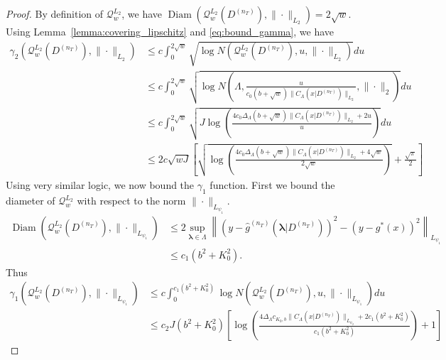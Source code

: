 \documentclass[10pt]{book}
\theoremstyle{definition}
\DeclareMathOperator{\Diam}{Diam}
\begin{document}
\begin{proof}
	By definition of $\mathcal{Q}_{w}^{L_{2}}$, we have $\Diam\left(\mathcal{Q}_{w}^{L_{2}}(D^{(n_{T})}),\|\cdot\|_{L_{2}}\right)	=	2\sqrt{w}.$
	Using Lemma~\ref{lemma:covering_lipschitz} and \eqref{eq:bound_gamma}, we have
	\begin{align}
	\gamma_{2}\left(\mathcal{Q}_{w}^{L_{2}}(D^{(n_{T})}),\|\cdot\|_{L_{2}}\right)
	& \le	c\int_{0}^{2\sqrt{w}}\sqrt{\log N\left(\mathcal{Q}_{w}^{L_{2}}(D^{(n_{T})}),u,\|\cdot\|_{L_{2}}\right)}du \\
	& \le	c\int_{0}^{2\sqrt{w}}\sqrt{\log N\left(\Lambda,\frac{u}{c_0 \left(b +\sqrt{w}\right)\|C_\Lambda(x|D^{(n_T)})\|_{L_{2}}},\|\cdot\|_{2}\right)}du \\
	& \le	c\int_{0}^{2\sqrt{w}}\sqrt{J\log\left(\frac{4 c_0 \Delta_{\Lambda}\left(b +\sqrt{w}\right)\|C_\Lambda(x|D^{(n_T)})\|_{L_{2}}+2u}{u}\right)}du\\
	& \le	2c\sqrt{w J}\left[\sqrt{\log\left(\frac{4 c_0  \Delta_{\Lambda}\left(b +\sqrt{w}\right)\|C_\Lambda(x|D^{(n_T)})\|_{L_{2}}+4\sqrt{w}}{2\sqrt{w}}\right)}+\frac{\sqrt{\pi}}{2}\right]
	\end{align}
	Using very similar logic, we now bound the $\gamma_1$ function.
	First we bound the diameter of $\mathcal{Q}_w^{L_2}$ with respect to the norm $\|\cdot \|_{L_{\psi_1}}$.
	\begin{align}
	\Diam(\mathcal{Q}_w^{L_2}(D^{(n_T)}), \|\cdot \|_{L_{\psi_1}})
	& \le 2 \sup_{\boldsymbol{\lambda} \in \Lambda}
	\left \|
	\left(
	y - \hat{g}^{(n_T)}(\boldsymbol{\lambda}| D^{(n_T)})
	\right)^2
	-
	\left(
	y - g^*(x)
	\right)^2
	\right \|_{L_{\psi_1}}\\
	& \le
	c_1 (b^2 + K_0^2).
	\label{eq:diam_psi1}
	\end{align}
	Thus
	\begin{align}
	\gamma_{1}\left(\mathcal{Q}_{w}^{L_{2}}(D^{(n_{T})}),\|\cdot\|_{L_{\psi_{1}}}\right)
	&\le c\int_{0}^{c_1 (b^2 + K_0^2)}\log N\left(\mathcal{Q}_{w}^{L_{2}}(D^{(n_{T})}),u,\|\cdot\|_{L_{\psi_{1}}}\right)du\\
	& \le c_2 J (b^2 + K_0^2)\left[
	\log\left(
	\frac{4 \Delta_{\Lambda}c_{K_0, b} \|C_\Lambda(x|D^{(n_T)})\|_{L_{\psi_{2}}}+ 2 c_1(b^2 + K_0^2)}
	{c_1(b^2 + K_0^2)}
	\right)+1\right]
	\end{align}
\end{proof}
\end{document}
